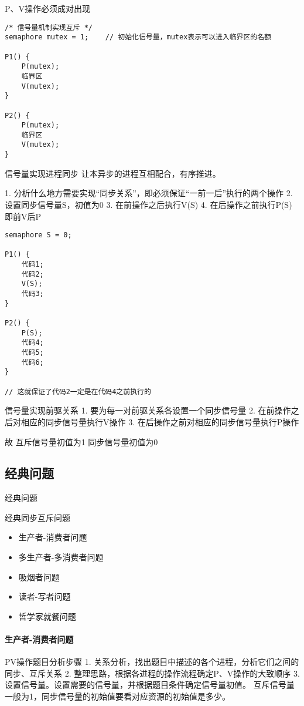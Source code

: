 P、V操作必须成对出现

\begin{lstlisting}
/* 信号量机制实现互斥 */
semaphore mutex = 1;	// 初始化信号量，mutex表示可以进入临界区的名额 

P1() {
	P(mutex);
	临界区
	V(mutex);
}

P2() {
	P(mutex);
	临界区
	V(mutex);
}

\end{lstlisting}

信号量实现进程同步
让本异步的进程互相配合，有序推进。

1. 分析什么地方需要实现“同步关系”，即必须保证“一前一后”执行的两个操作
2. 设置同步信号量S，初值为0
3. 在前操作之后执行V(S)
4. 在后操作之前执行P(S) 即前V后P

\begin{lstlisting}
semaphore S = 0;

P1() {
	代码1;
	代码2;
	V(S);
	代码3;
}

P2() {
	P(S);
	代码4;
	代码5;
	代码6;
}

// 这就保证了代码2一定是在代码4之前执行的
\end{lstlisting}


信号量实现前驱关系
1. 要为每一对前驱关系各设置一个同步信号量
2. 在前操作之后对相应的同步信号量执行V操作
3. 在后操作之前对相应的同步信号量执行P操作

故
互斥信号量初值为1
同步信号量初值为0

\subsection{经典问题}
经典问题

经典同步互斥问题
\begin{itemize}
	\item 生产者-消费者问题
	\item 多生产者-多消费者问题
	\item 吸烟者问题
	\item 读者-写者问题
	\item 哲学家就餐问题
\end{itemize}

\paragraph{生产者-消费者问题}
PV操作题目分析步骤
1. 关系分析，找出题目中描述的各个进程，分析它们之间的同步、互斥关系
2. 整理思路，根据各进程的操作流程确定P、V操作的大致顺序
3. 设置信号量。设置需要的信号量，并根据题目条件确定信号量初值。
互斥信号量一般为1，同步信号量的初始值要看对应资源的初始值是多少。


